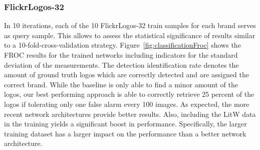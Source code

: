 \documentclass[a4paper,twoside]{article}
\begin{document}
\subsubsection*{FlickrLogos-32}
\vspace*{-2.5mm}
In 10 iterations, each of the 10 FlickrLogos-32 train samples for each brand serves as query sample. This allows to assess the statistical significance of results similar to a 10-fold-cross-validation strategy. Figure~\ref{fig:classificationFroc} shows the FROC results for the trained networks including indicators for the standard deviation of the measurements. The detection identification rate denotes the amount of ground truth logos which are correctly detected and are assigned the correct brand.
While the baseline is only able to find a minor amount of the logos, our best performing approach is able to correctly retrieve 25 percent of the logos if tolerating only one false alarm every 100 images.
As expected, the more recent network architectures provide better results. Also, including the \ac{LitW} data in the training yields a significant boost in performance. Specifically, the larger training dataset has a larger impact on the performance than a better network architecture. 
%
\end{document}
